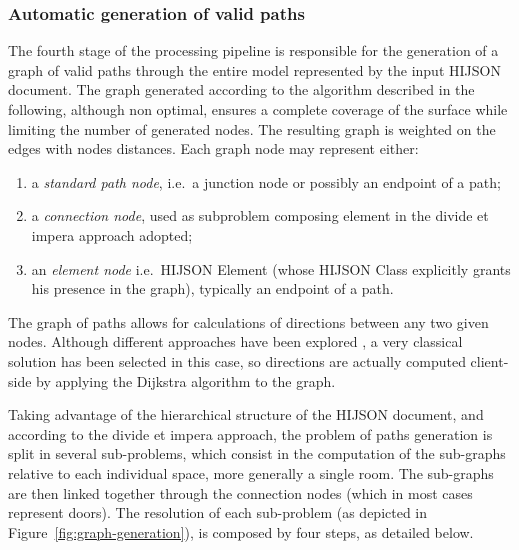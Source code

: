\subsubsection{Automatic generation of valid paths}\label{algorithmics-automatic-generation-of-valid-paths}\label{sec:paths}

The fourth stage of the processing pipeline is responsible for the
generation of a graph of valid paths through the entire model
represented by the input HIJSON document. The graph generated according
to the algorithm described in the following, although non optimal,
ensures a complete coverage of the surface while limiting the number of
generated nodes. The resulting graph is weighted on the edges with nodes
distances. Each graph node may represent either:

\begin{enumerate}
\def\labelenumi{\alph{enumi}.}
\itemsep1pt\parskip0pt
\item
 a \emph{standard path node}, i.e.~a junction node or possibly an endpoint of a
 path;
\item
 a \emph{connection node}, used as subproblem composing element in the divide et
 impera approach adopted;
\item
an \emph{element node} i.e.~HIJSON Element (whose HIJSON Class explicitly grants
 his presence in the graph), typically an endpoint of a path.
\end{enumerate}

The graph of paths allows for calculations of directions between any two given
nodes. Although different approaches have been explored \cite{6999103}, 
a very classical solution has been selected in this case, so directions 
are actually computed client-side by applying the Dijkstra algorithm to the graph. 

Taking advantage of the hierarchical structure of the HIJSON document,
and according to the divide et impera approach, the problem of 
paths generation is split in several sub-problems, which consist in
the computation of the sub-graphs relative to each individual space, more generally a single room. The sub-graphs are then linked together through the
connection nodes (which in most cases represent doors). The resolution
of each sub-problem (as depicted in Figure~\ref{fig:graph-generation}), 
is composed by four steps, as detailed below.

